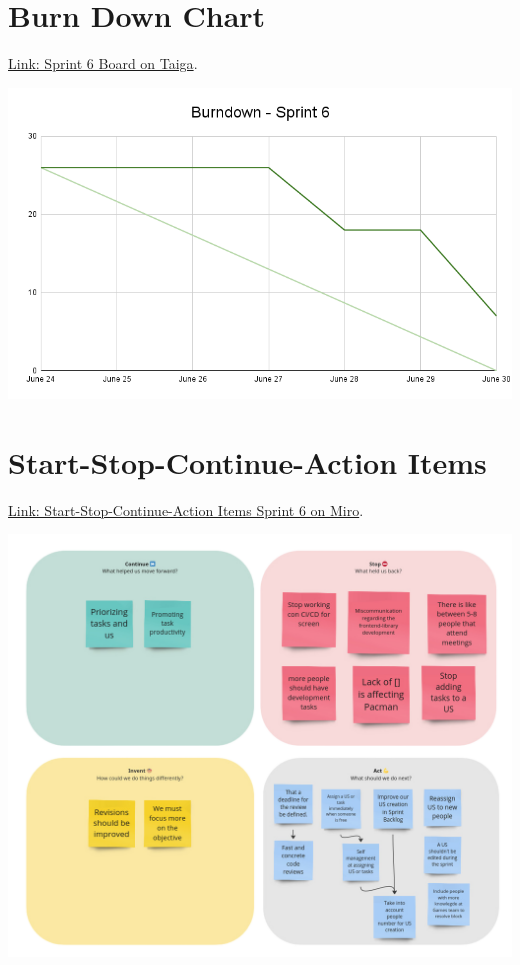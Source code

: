\documentclass{article}
\begin{document}
\hypertarget{burndownchart-s3}{
\section{Burn Down Chart}\label{Burn Down Chart S3}}
\href{https://tree.taiga.io/project/joseluis-teran-coffeetime/taskboard/sprint-6-3003}{Link: Sprint 6 Board on Taiga}.

\includegraphics[width=\textwidth]{./assets/Burndown-Sprint6.png}

\hypertarget{startstopcontinueactionitems-s3}{
\section{Start-Stop-Continue-Action Items}\label{Start-Stop-Continue-Action Items S6}}
\href{https://miro.com/app/board/uXjVKDO7l8M=/?moveToWidget=3458764591631763576&cot=14}{Link: Start-Stop-Continue-Action Items Sprint 6 on Miro}.

\includegraphics[width=\textwidth]{./assets/retrospective-s6.png}
\end{document}
